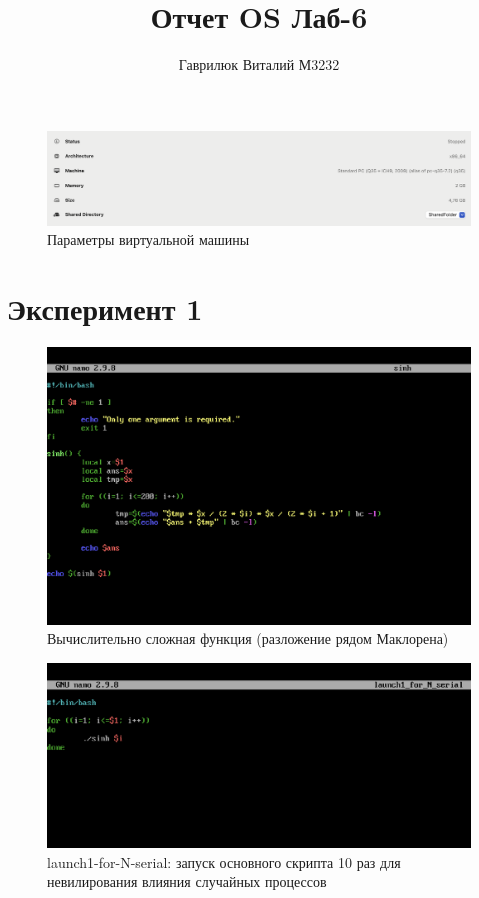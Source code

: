 \documentclass{article}
\title{Отчет OS Лаб-6}
\author{Гаврилюк Виталий М3232}
\date{}
\begin{document}
\maketitle

\begin{figure}[H]
\centering
\includegraphics[width=1\textwidth]{images/1.png}
\caption{Параметры виртуальной машины}
\end{figure} 

\section*{Эксперимент 1}

\begin{figure}[H]
\centering
\includegraphics[width=1\textwidth]{images/2.png}
\caption{Вычислительно сложная функция (разложение рядом Маклорена)}
\end{figure} 

\begin{figure}[H]
\centering
\includegraphics[width=1\textwidth]{images/3.png}
\caption{launch1-for-N-serial: запуск основного скрипта 10 раз для невилирования влияния случайных процессов}
\end{figure}
\end{document}
